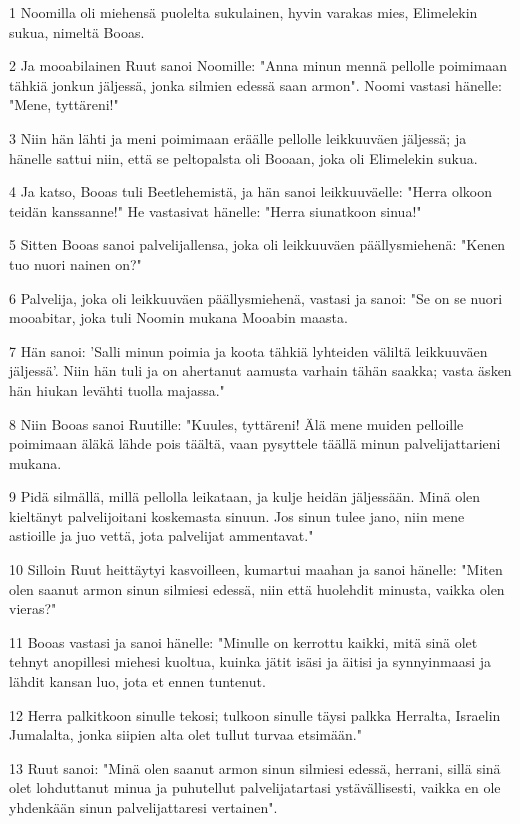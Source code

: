 \par 1 Noomilla oli miehensä puolelta sukulainen, hyvin varakas mies, Elimelekin sukua, nimeltä Booas.
\par 2 Ja mooabilainen Ruut sanoi Noomille: "Anna minun mennä pellolle poimimaan tähkiä jonkun jäljessä, jonka silmien edessä saan armon". Noomi vastasi hänelle: "Mene, tyttäreni!"
\par 3 Niin hän lähti ja meni poimimaan eräälle pellolle leikkuuväen jäljessä; ja hänelle sattui niin, että se peltopalsta oli Booaan, joka oli Elimelekin sukua.
\par 4 Ja katso, Booas tuli Beetlehemistä, ja hän sanoi leikkuuväelle: "Herra olkoon teidän kanssanne!" He vastasivat hänelle: "Herra siunatkoon sinua!"
\par 5 Sitten Booas sanoi palvelijallensa, joka oli leikkuuväen päällysmiehenä: "Kenen tuo nuori nainen on?"
\par 6 Palvelija, joka oli leikkuuväen päällysmiehenä, vastasi ja sanoi: "Se on se nuori mooabitar, joka tuli Noomin mukana Mooabin maasta.
\par 7 Hän sanoi: 'Salli minun poimia ja koota tähkiä lyhteiden väliltä leikkuuväen jäljessä'. Niin hän tuli ja on ahertanut aamusta varhain tähän saakka; vasta äsken hän hiukan levähti tuolla majassa."
\par 8 Niin Booas sanoi Ruutille: "Kuules, tyttäreni! Älä mene muiden pelloille poimimaan äläkä lähde pois täältä, vaan pysyttele täällä minun palvelijattarieni mukana.
\par 9 Pidä silmällä, millä pellolla leikataan, ja kulje heidän jäljessään. Minä olen kieltänyt palvelijoitani koskemasta sinuun. Jos sinun tulee jano, niin mene astioille ja juo vettä, jota palvelijat ammentavat."
\par 10 Silloin Ruut heittäytyi kasvoilleen, kumartui maahan ja sanoi hänelle: "Miten olen saanut armon sinun silmiesi edessä, niin että huolehdit minusta, vaikka olen vieras?"
\par 11 Booas vastasi ja sanoi hänelle: "Minulle on kerrottu kaikki, mitä sinä olet tehnyt anopillesi miehesi kuoltua, kuinka jätit isäsi ja äitisi ja synnyinmaasi ja lähdit kansan luo, jota et ennen tuntenut.
\par 12 Herra palkitkoon sinulle tekosi; tulkoon sinulle täysi palkka Herralta, Israelin Jumalalta, jonka siipien alta olet tullut turvaa etsimään."
\par 13 Ruut sanoi: "Minä olen saanut armon sinun silmiesi edessä, herrani, sillä sinä olet lohduttanut minua ja puhutellut palvelijatartasi ystävällisesti, vaikka en ole yhdenkään sinun palvelijattaresi vertainen".
